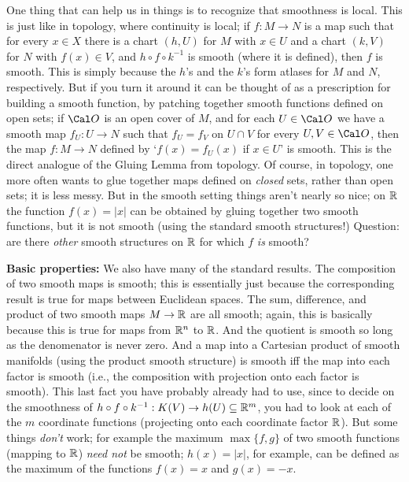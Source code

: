 One thing that can help us in things is to recognize that smoothness is local.
This is just like in topology, where continuity is local; if $f:M\rightarrow N$
is a map such that for every $x\in X$ there is a chart $(h,U)$ for $M$ with $x\in U$
and a chart $(k,V)$ for $N$ with $f(x)\in V$, and $h\circ f\circ k^{-1}$ is smooth
(where it is defined), 
then $f$ is smooth. This is simply because the $h$'s and the $k$'s form atlases
for $M$ and $N$, respectively. But if you turn it around it can be thought of as a prescription
for building a smooth function, by patching together smooth functions defined on open sets;
if $\Cal O$ is an open cover of $M$, and for each $U\in {\Cal O}$ we have a
smooth map $f_U:U\rightarrow N$ such that $f_U=f_V$ on $U\cap V$ for every $U,V\in {\Cal O}$,
then the map $f:M\rightarrow N$ defined by `$f(x)=f_U(x)$ if $x\in U$' is smooth. This is
the direct analogue of the Gluing Lemma from topology. Of course, in topology, one more
often wants to glue together maps defined on {\it closed} sets, rather than open sets;
it is less messy. But in the smooth setting things aren't nearly so nice;
on ${\Bbb R}$ the function $f(x)=|x|$ can be obtained by gluing together two smooth
functions, but it is not smooth (using the standard smooth structures!) Question:
are there {\it other} smooth structures on ${\Bbb R}$ for which $f$ {\it is} smooth?

{\bf Basic properties:} We also have many of the standard results. The composition of two smooth maps is smooth;
this is essentially just because the corresponding result is true for maps between
Euclidean spaces. The sum, difference, and product of two smooth maps $M\rightarrow{\Bbb R}$
are all smooth; again, this is basically because this is true for maps from ${\Bbb R}^n$ to ${\Bbb R}$.
And the quotient is smooth so long as the denomenator is never zero. And a map into a Cartesian 
product of smooth manifolds (using the product smooth structure) is smooth iff the map into
each factor is smooth (i.e., the composition with projection onto each factor is smooth). 
This last fact you have probably already had to use, since to decide
on the smoothness of $h\circ f \circ k^{-1}:K(V)\rightarrow h(U)\subseteq {\Bbb R}^m$, 
you had to look at each of the $m$ coordinate functions (projecting onto each coordinate 
factor ${\Bbb R}$). But some things {\it don't} work; for example the maximum $\max\{f,g\}$
of two smooth functions (mapping to ${\Bbb R}$) {\it need not} be smooth; $h(x)=|x|$, for example, can 
be defined as the maximum of the functions $f(x)=x$ and $g(x)=-x$.

